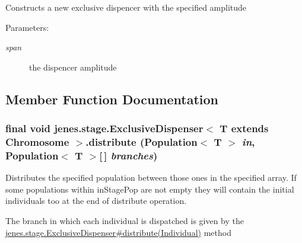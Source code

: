 Constructs a new exclusive dispencer with the specified amplitude

\begin{Desc}
\item[Parameters:]
\begin{description}
\item[{\em span}]the dispencer amplitude \end{description}
\end{Desc}


\subsection{Member Function Documentation}
\hypertarget{classjenes_1_1stage_1_1_exclusive_dispenser_3_01_t_01extends_01_chromosome_01_4_7ecda0fa0e34e3a31ab2d06cd2b6d593}{
\subsubsection[distribute]{\setlength{\rightskip}{0pt plus 5cm}final void jenes.stage.ExclusiveDispenser$<$ T extends Chromosome $>$.distribute (Population$<$ T $>$ {\em in}, \/  Population$<$ T $>$\mbox{[}$\,$\mbox{]} {\em branches})}}
\label{classjenes_1_1stage_1_1_exclusive_dispenser_3_01_t_01extends_01_chromosome_01_4_7ecda0fa0e34e3a31ab2d06cd2b6d593}


Distributes the specified population between those ones in the specified array. If some populations within inStagePop are not empty they will contain the initial individuals too at the end of distribute operation.

The branch in which each individual is dispatched is given by the \hyperlink{}{jenes.stage.ExclusiveDispenser\#distribute(Individual)} method

